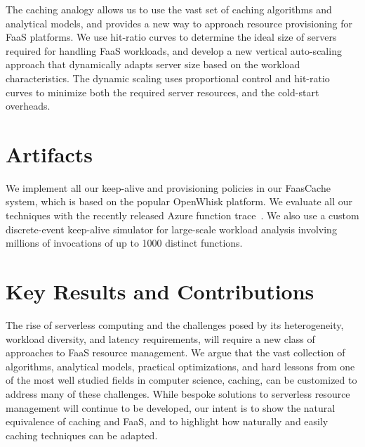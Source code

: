 \documentclass[pageno]{jpaper}
\begin{document}
The caching analogy allows us to use the vast set of caching algorithms and  analytical models, and provides a new way to approach resource provisioning for FaaS platforms.
We use hit-ratio curves to determine the ideal size of servers required for handling FaaS workloads, and develop a new vertical auto-scaling approach that dynamically adapts server size based on the workload characteristics.
The dynamic scaling uses proportional control and hit-ratio curves to minimize both the required server resources, and the cold-start overheads. 


\section{Artifacts}
\vspace*{\subsecspace}

We implement all our keep-alive and provisioning policies in our FaasCache system, which is based on the popular OpenWhisk platform. 
We evaluate all our techniques with the recently released Azure function trace~\cite{shahrad_serverless_2020}. 
We also use a custom discrete-event keep-alive simulator for large-scale workload analysis involving millions of invocations of up to 1000 distinct functions. 

%


\section{Key Results and Contributions}
\vspace*{\subsecspace}

The rise of serverless computing and the challenges posed by its heterogeneity, workload diversity, and latency requirements, will require a new class of approaches to FaaS resource management. 
We argue that the vast collection of algorithms, analytical models, practical optimizations, and hard lessons from one of the most well studied fields in computer science, caching, can be customized to address many of these challenges. 
While bespoke solutions to serverless resource management will continue to be developed, our intent is to show the natural equivalence of caching and FaaS, and to highlight how naturally and easily caching techniques can be adapted. 
\end{document}
